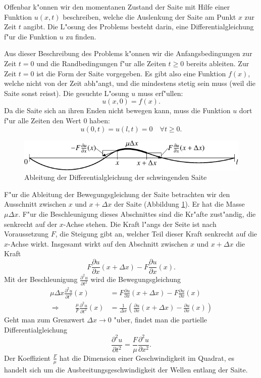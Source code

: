 Offenbar k"onnen wir den momentanen Zustand der Saite mit Hilfe einer
Funktion $u(x,t)$ beschreiben, welche die Auslenkung der Saite
am Punkt $x$ zur Zeit $t$ angibt. Die L"osung des Problems besteht darin,
eine Differentialgleichung f"ur die Funktion $u$ zu finden.

Aus dieser Beschreibung des Problems k"onnen wir die Anfangsbedingungen zur
Zeit $t=0$ und die Randbedingungen f"ur alle Zeiten $t\ge 0$ bereits ableiten.
Zur Zeit $t=0$ ist die Form der Saite vorgegeben. Es gibt also eine Funktion
$f(x)$, welche nicht von der Zeit abh"angt, und die mindestens stetig
sein muss (weil die Saite sonst reisst). Die gesuchte L"osung $u$
muss erf"ullen:
\[
u(x,0)=f(x).
\]
Da die Saite sich an ihren Enden nicht bewegen kann, muss die Funktion
$u$ dort f"ur alle Zeiten den Wert $0$ haben:
\[
u(0,t)=u(l,t)=0\quad\forall t\ge 0.
\]

\begin{figure}
\begin{center}
\includegraphics[width=\hsize]{images/saite-1}
\end{center}
\caption{Ableitung der Differentialgleichung der schwingenden Saite\label{saite}}
\end{figure}
F"ur die Ableitung der Bewegungsgleichung der Saite betrachten wir den
Ausschnitt zwischen $x$ und $x+\Delta x$ der Saite (Abbildung \ref{saite}).
Er hat die Masse
$\mu \Delta x$. F"ur die Beschleunigung dieses Abschnittes sind die
Kr"afte zust"andig, die senkrecht auf der $x$-Achse stehen. Die Kraft l"angs
der Seite ist nach Voraussetzung $F$, die Steigung gibt an, welcher Teil
dieser Kraft senkrecht auf die $x$-Achse wirkt. Insgesamt wirkt auf den
Abschnitt zwischen $x$ und $x+\Delta x$ die Kraft
\[
F\frac{\partial u}{\partial x}(x+\Delta x)-F\frac{\partial u}{\partial x}(x).
\]
Mit der Beschleunigung $\frac{\partial^2u}{\partial t^2}$ wird die
Bewegungsgleichung
\begin{align*}
\mu\Delta x\frac{\partial^2u}{\partial t^2}(x)&=
F\frac{\partial u}{\partial x}(x+\Delta x)-F\frac{\partial u}{\partial x}(x)\\
\Rightarrow\qquad
\frac{\mu}{F}\frac{\partial^2u}{\partial t^2}(x)&=
\frac1{\Delta x}\left(\frac{\partial u}{\partial x}(x+\Delta x)-\frac{\partial u}{\partial x}(x)\right)
\end{align*}
Geht man zum Grenzwert $\Delta x\to 0$ "uber, findet man die
partielle Differentialgleichung
\[
\frac{\partial^2u}{\partial t^2}=\frac{F}{\mu}\frac{\partial^2u}{\partial x^2}.
\]
Der Koeffizient $\frac{F}{\mu}$ hat die Dimension einer Geschwindigkeit im
Quadrat, es handelt sich um die Ausbreitungsgeschwindigkeit der Wellen entlang
der Saite.

